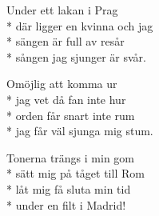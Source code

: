 \begin{SongText}
\begin{SongVerse}
\end{SongVerse}
\begin{SongVerse}
Under ett lakan i Prag\\*%
där ligger en kvinna och jag\\*%
sängen är full av resår\\*%
sången jag sjunger är svår.
\end{SongVerse}
\begin{SongVerse}
Omöjlig att komma ur\\*%
jag vet då fan inte hur\\*%
orden får snart inte rum\\*%
jag får väl sjunga mig stum.
\end{SongVerse}
\begin{SongVerse}
Tonerna trängs i min gom\\*%
sätt mig på tåget till Rom\\*%
låt mig få sluta min tid\\*%
under en filt i Madrid! 
\end{SongVerse}
\end{SongText}
